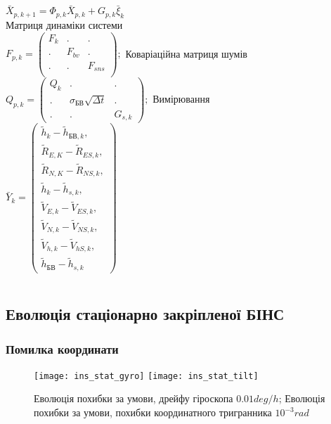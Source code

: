 \documentclass[ucs]{beamer}
\begin{document}
\begin{frame}[shrink=5]
\begin{columns}[t]
\begin{column}{5cm}
$\bar{X}_{p,k+1} =\Phi_{p,k} \bar{X}_{p,k} +G_{p,k} \bar{\xi }_{k}$ \\
Матриця динаміки системи\\
$ F_{p,k} =\left(\begin{array}{ccc} 
{F_{k} } & {.} & {.} \\
{.} & {F_{bv}} & {.} \\
{.} & {.} & {F_{sns}} \\
\end{array}\right);$
Коваріаційна матриця шумів\\
$Q_{p,k} =\left(\begin{array}{ccc} 
{Q_{k} } & {.} & {.} \\ 
{.} & {\sigma_{\text{БВ}} \sqrt{\Delta t}} & {.} \\ 
{.} & {.} & {G_{s,k} } \end{array}\right);$
Вимірювання\\
$\bar{Y}_{k} = 
\left(\begin{array}{l}
{\tilde{h}_{k} -\tilde{h}_{\text{БВ},k},}\\
{\tilde{R}_{E,K} -\tilde{R}_{ES,k},}\\
{\tilde{R}_{N,K} -\tilde{R}_{NS,k},}\\
{\tilde{h}_{k} -\tilde{h}_{s,k},}\\
{\tilde{V}_{E,k} -\tilde{V}_{ES,k},}\\
{\tilde{V}_{N,k} -\tilde{V}_{NS,k},}\\
{\tilde{V}_{h,k} -\tilde{V}_{hS,k},}\\
{\tilde{h}_{\text{БВ}} -\tilde{h}_{s,k}}
\end{array} \right) $

\end{column}
\end{columns}


\end{frame}

\subsection{Еволюція стаціонарно закріпленої БІНС} 
\begin{frame}[plain]
\frametitle{Помилка координати}

\begin{figure}[l]
\texttt{[image: ins\_stat\_gyro]}
\texttt{[image: ins\_stat\_tilt]}
\caption{\tiny Еволюція похибки за умови, дрейфу гіроскопа $0.01 deg/h$; Еволюція похибки за умови, похибки координатного тригранника $10^{-3} rad$}
\label{fig:sdins2}
\end{figure}
\end{frame}
\end{document}
